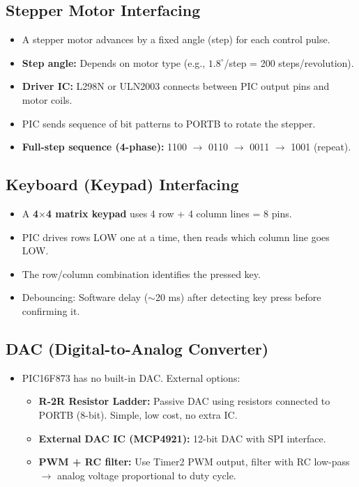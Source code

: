 \documentclass[12pt,a4paper]{article}
\begin{document}
\subsection{Stepper Motor Interfacing}
\begin{itemize}[leftmargin=*, itemsep=3pt]
  \item A stepper motor advances by a fixed angle (step) for each control pulse.
  \item \textbf{Step angle:} Depends on motor type (e.g., $1.8^\circ$/step = 200 steps/revolution).
  \item \textbf{Driver IC:} L298N or ULN2003 connects between PIC output pins and motor coils.
  \item PIC sends sequence of bit patterns to PORTB to rotate the stepper.
  \item \textbf{Full-step sequence (4-phase):} 1100 $\to$ 0110 $\to$ 0011 $\to$ 1001 (repeat).
\end{itemize}

\subsection{Keyboard (Keypad) Interfacing}
\begin{itemize}[leftmargin=*, itemsep=3pt]
  \item A \textbf{4$\times$4 matrix keypad} uses 4 row + 4 column lines = 8 pins.
  \item PIC drives rows LOW one at a time, then reads which column line goes LOW.
  \item The row/column combination identifies the pressed key.
  \item Debouncing: Software delay ($\sim$20 ms) after detecting key press before confirming it.
\end{itemize}

\subsection{DAC (Digital-to-Analog Converter)}
\begin{itemize}[leftmargin=*, itemsep=3pt]
  \item PIC16F873 has no built-in DAC. External options:
    \begin{itemize}
      \item \textbf{R-2R Resistor Ladder:} Passive DAC using resistors connected to PORTB (8-bit). Simple, low cost, no extra IC.
      \item \textbf{External DAC IC (MCP4921):} 12-bit DAC with SPI interface.
      \item \textbf{PWM + RC filter:} Use Timer2 PWM output, filter with RC low-pass $\to$ analog voltage proportional to duty cycle.
    \end{itemize}
\end{itemize}
\end{document}
